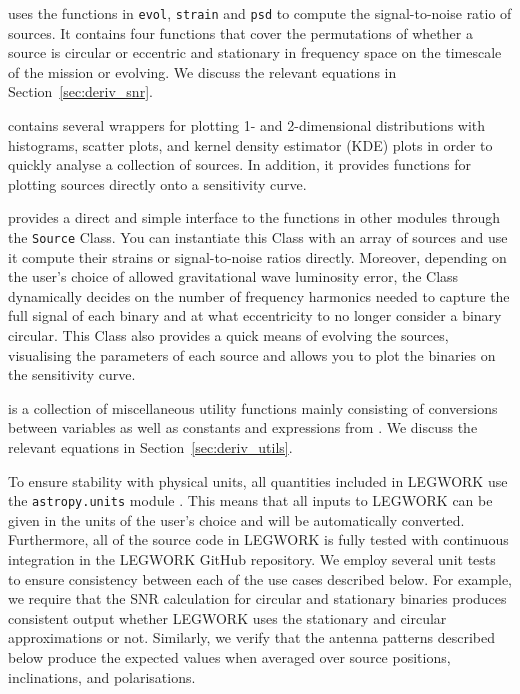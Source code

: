 \documentclass[twocolumn, linenumbers]{aastex631}
\newcommand{\lw}{LEGWORK}
\newcommand{\lwColour}{SeaGreen}
\newcommand{\lwModLink}[1]{\href{https://legwork.readthedocs.io/en/latest/modules.html\#module-legwork.#1}{\color{\lwColour}{\texttt{#1}}}}
\begin{document}
\lwModLink{snr} uses the functions in \texttt{evol}, \texttt{strain} and \texttt{psd} to compute the signal-to-noise ratio of sources. It contains four functions that cover the permutations of whether a source is circular or eccentric and stationary in frequency space on the timescale of the mission or evolving. We discuss the relevant equations in Section~\ref{sec:deriv_snr}.

\lwModLink{visualisation} contains several wrappers for plotting 1- and 2-dimensional distributions with histograms, scatter plots, and kernel density estimator (KDE) plots in order to quickly analyse a collection of sources. In addition, it provides functions for plotting sources directly onto a sensitivity curve.

\lwModLink{source} provides a direct and simple interface to the functions in other modules through the \texttt{Source} Class. You can instantiate this Class with an array of sources and use it compute their strains or signal-to-noise ratios directly. Moreover, depending on the user's choice of allowed gravitational wave luminosity error, the Class dynamically decides on the number of frequency harmonics needed to capture the full signal of each binary and at what eccentricity to no longer consider a binary circular. This Class also provides a quick means of evolving the sources, visualising the parameters of each source and allows you to plot the binaries on the sensitivity curve.

\lwModLink{utils} is a collection of miscellaneous utility functions mainly consisting of conversions between variables as well as constants and expressions from \citet{Peters+1964}. We discuss the relevant equations in Section~\ref{sec:deriv_utils}.

To ensure stability with physical units, all quantities included in \lw{} use the \texttt{astropy.units} module \citep{AstropyCollaboration+2013, AstropyCollaboration+2018}. This means that all inputs to \lw{} can be given in the units of the user's choice and will be automatically converted. Furthermore, all of the source code in \lw{} is fully tested with continuous integration in the \lw{} GitHub repository. We employ several unit tests to ensure consistency between each of the use cases described below. For example, we require that the SNR calculation for circular and stationary binaries produces consistent output whether \lw{} uses the stationary and circular approximations or not. Similarly, we verify that the antenna patterns described below produce the expected values when averaged over source positions, inclinations, and polarisations.
\end{document}
